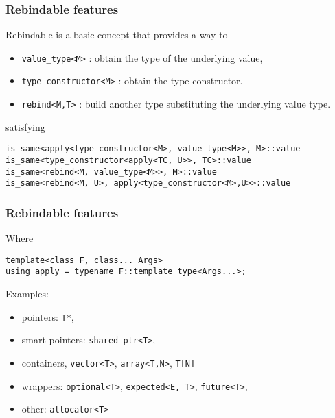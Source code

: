 \documentclass[xcolor=dvipsnames]{beamer}
\newcommand{\cpp}[1]{\lstinline{#1}}
\begin{document}
\begin{frame}[fragile]
\frametitle{Rebindable features}

Rebindable is a basic concept that provides a way to

\begin{itemize}
  \item \cpp{value_type<M>} : obtain the type of the underlying value, 
  \item \cpp{type_constructor<M>} : obtain the type constructor. 
  \item \cpp{rebind<M,T>} : build another type substituting the underlying value type. 
\end{itemize}

satisfying 

\begin{lstlisting}
is_same<apply<type_constructor<M>, value_type<M>>, M>::value
is_same<type_constructor<apply<TC, U>>, TC>::value
is_same<rebind<M, value_type<M>>, M>::value
is_same<rebind<M, U>, apply<type_constructor<M>,U>>::value
\end{lstlisting}

\end{frame}
\begin{frame}[fragile]
\frametitle{Rebindable features}

Where

\begin{lstlisting}
template<class F, class... Args>
using apply = typename F::template type<Args...>;
\end{lstlisting}

Examples:
\begin{itemize}
  \item pointers:  \cpp{T*}, 
  \item smart pointers: \cpp{shared_ptr<T>}, 
  \item containers, \cpp{vector<T>},  \cpp{array<T,N>},  \cpp{T[N]} 
  \item wrappers: \cpp{optional<T>}, \cpp{expected<E, T>}, \cpp{future<T>},
  \item other: \cpp{allocator<T>}   
\end{itemize}

\end{frame}

\end{document}
